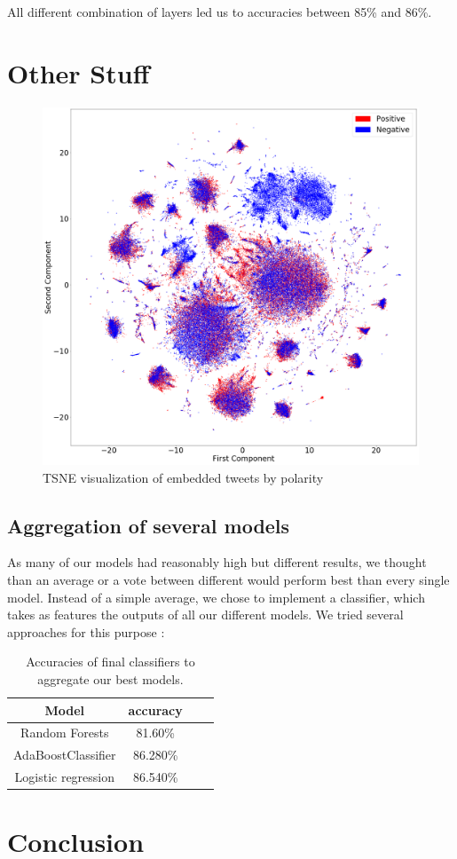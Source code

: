 \documentclass[10pt,conference,compsocconf,retainorgcmds]{IEEEtran}
\begin{document}
All different combination of layers led us to accuracies between 85\% and 86\%.

\section{Other Stuff}
\begin{figure}[h]
    \centering
    \includegraphics[width=\linewidth]{imag/tweets_tsne.png}
    \caption{TSNE visualization of embedded tweets by polarity}
    \label{fig:my_label}
\end{figure}

\subsection{Aggregation of several models}

As many of our models had reasonably high but different results, we thought than an average or a vote between different would perform best than every single model. Instead of a simple average, we chose to implement a classifier, which takes as features the outputs of all our different models. We tried several approaches for this purpose : 
\begin{table}[h]
\begin{center}
\begin{tabular}{|c|c|c|c|}
\hline
Model & accuracy \\
\hline
Random Forests & 81.60\% \\
\hline
AdaBoostClassifier & 86.280\% \\
\hline
Logistic regression & 86.540\% \\
\hline

\end{tabular}
\label{classifier}
\caption{Accuracies of final classifiers to aggregate our best models.}
\end{center}
\end{table}


\section{Conclusion}
\end{document}

